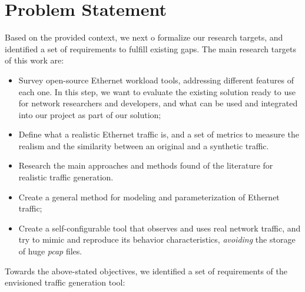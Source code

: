 \section{Problem Statement}


Based on the provided context,  we next o formalize our research targets, and identified a set of requirements to fulfill existing gaps. The main research targets of this work are:

\begin{itemize}
	
	\item Survey open-source Ethernet workload tools, addressing different features of each one. In this step, we want to evaluate the existing solution ready to use for network researchers and developers, and what can be used and integrated into our project as part of our solution;
	
	\item Define what a realistic Ethernet traffic is, and a set of metrics to measure the realism and the similarity between an original and a synthetic traffic.
	
	\item Research the main approaches and methods found of the literature for realistic traffic generation. 
	
	\item Create a general method for modeling and parameterization of Ethernet traffic;
	
	\item Create a self-configurable tool that observes and uses real network traffic, and try to mimic and reproduce its behavior characteristics, \textit{avoiding} the storage of huge \textit{pcap} files.
	
\end{itemize}

Towards the above-stated objectives, we identified a set of requirements of the envisioned traffic generation tool:

